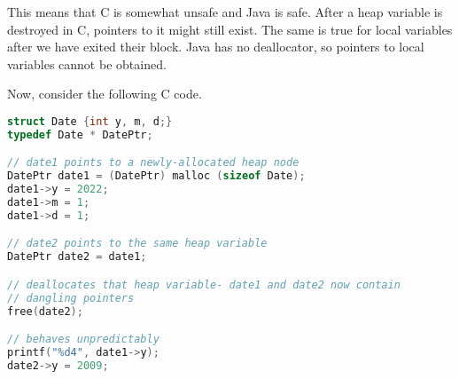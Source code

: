 \documentclass[a4paper, openany]{memoir}
\begin{document}
This means that C is somewhat unsafe and Java is safe. After a heap variable is destroyed in C, pointers to it might still exist. The same is true for local variables after we have exited their block. Java has no deallocator, so pointers to local variables cannot be obtained.

Now, consider the following C code.
\begin{lstlisting}[language=C]
struct Date {int y, m, d;}
typedef Date * DatePtr;

// date1 points to a newly-allocated heap node
DatePtr date1 = (DatePtr) malloc (sizeof Date);
date1->y = 2022;
date1->m = 1;
date1->d = 1;

// date2 points to the same heap variable
DatePtr date2 = date1;

// deallocates that heap variable- date1 and date2 now contain 
// dangling pointers
free(date2);

// behaves unpredictably
printf("%d4", date1->y);
date2->y = 2009;
\end{lstlisting}
\end{document}
